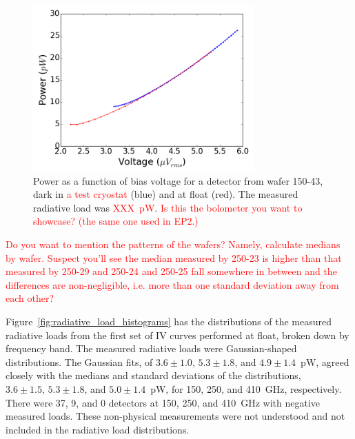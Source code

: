 \begin{figure}[ht!]
\begin{center}
\includegraphics[height=2.5in]{figures/board70_wire3_ch02_light_dark_pv_curves.png}
\caption{Power as a function of bias voltage for a detector from wafer 150-43, dark in \textcolor{red}{a test cryostat} (blue) and at float (red). The measured radiative load was \textcolor{red}{XXX~pW}.
\textcolor{red}{Is this the bolometer you want to showcase? (the same one used in EP2.)}
\label{fig:dark_light_iv_curves} }
\end{center}
\end{figure}


\textcolor{red}{Do you want to mention the patterns of the wafers? Namely, calculate medians by wafer. Suspect you'll see the median measured by 250-23 is higher than that measured by 250-29 and 250-24 and 250-25 fall somewhere in between and the differences are non-negligible, i.e. more than one standard deviation away from each other?}

Figure~\ref{fig:radiative_load_histograms} has the distributions of the measured radiative loads from the first set of IV curves performed at float, broken down by frequency band. 
The measured radiative loads were Gaussian-shaped distributions. 
The Gaussian fits, of $3.6\pm 1.0, \, 5.3\pm 1.8$, and $4.9 \pm 1.4$~pW, agreed closely with the  medians and standard deviations of the distributions, $3.6\pm1.5, \, 5.3\pm1.8$, and $5.0\pm1.4$~pW, 
for 150, 250, and 410~GHz, respectively. 
There were 37, 9, and 0 detectors at 150, 250, and 410~GHz with negative measured loads. 
These non-physical measurements were not understood and not included in the radiative load distributions. 

